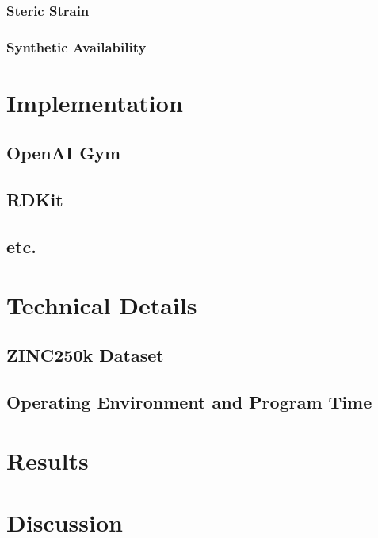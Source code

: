 \documentclass{article}
\begin{document}
\subsubsection*{Steric Strain}
\subsubsection*{Synthetic Availability}
\section{Implementation}
\subsection{OpenAI Gym}
\subsection{RDKit}
\subsection{etc.}
\section{Technical Details}
\subsection{ZINC250k Dataset}
\subsection{Operating Environment and Program Time}
\section{Results}
\section{Discussion}
\end{document}
